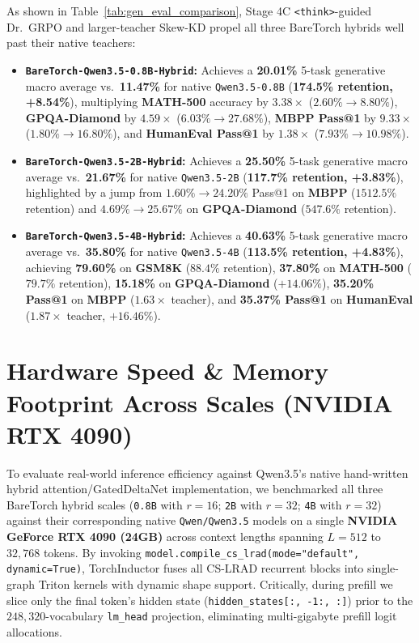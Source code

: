 \documentclass[twocolumn,10pt]{article}
\begin{document}
As shown in Table~\ref{tab:gen_eval_comparison}, Stage 4C \texttt{<think>}-guided Dr.\ GRPO and larger-teacher Skew-KD propel all three BareTorch hybrids well past their native teachers:
\begin{itemize}
    \item \textbf{\texttt{BareTorch-Qwen3.5-0.8B-Hybrid}:} Achieves a \textbf{20.01\%} 5-task generative macro average vs.\ \textbf{11.47\%} for native \texttt{Qwen3.5-0.8B} (\textbf{174.5\% retention, +8.54\%}), multiplying \textbf{MATH-500} accuracy by $3.38\times$ ($2.60\% \to \mathbf{8.80\%}$), \textbf{GPQA-Diamond} by $4.59\times$ ($6.03\% \to \mathbf{27.68\%}$), \textbf{MBPP Pass@1} by $9.33\times$ ($1.80\% \to \mathbf{16.80\%}$), and \textbf{HumanEval Pass@1} by $1.38\times$ ($7.93\% \to \mathbf{10.98\%}$).
    \item \textbf{\texttt{BareTorch-Qwen3.5-2B-Hybrid}:} Achieves a \textbf{25.50\%} 5-task generative macro average vs.\ \textbf{21.67\%} for native \texttt{Qwen3.5-2B} (\textbf{117.7\% retention, +3.83\%}), highlighted by a jump from $1.60\% \to \mathbf{24.20\%}$ Pass@1 on \textbf{MBPP} ($1512.5\%$ retention) and $4.69\% \to \mathbf{25.67\%}$ on \textbf{GPQA-Diamond} ($547.6\%$ retention).
    \item \textbf{\texttt{BareTorch-Qwen3.5-4B-Hybrid}:} Achieves a \textbf{40.63\%} 5-task generative macro average vs.\ \textbf{35.80\%} for native \texttt{Qwen3.5-4B} (\textbf{113.5\% retention, +4.83\%}), achieving \textbf{79.60\%} on \textbf{GSM8K} ($88.4\%$ retention), \textbf{37.80\%} on \textbf{MATH-500} ($79.7\%$ retention), \textbf{15.18\%} on \textbf{GPQA-Diamond} ($+14.06\%$), \textbf{35.20\% Pass@1} on \textbf{MBPP} ($1.63\times$ teacher), and \textbf{35.37\% Pass@1} on \textbf{HumanEval} ($1.87\times$ teacher, $+16.46\%$).
\end{itemize}

\section{Hardware Speed \& Memory Footprint Across Scales (NVIDIA RTX 4090)}
To evaluate real-world inference efficiency against Qwen3.5's native hand-written hybrid attention/GatedDeltaNet implementation, we benchmarked all three BareTorch hybrid scales (\texttt{0.8B} with $r=16$; \texttt{2B} with $r=32$; \texttt{4B} with $r=32$) against their corresponding native \texttt{Qwen/Qwen3.5} models on a single \textbf{NVIDIA GeForce RTX 4090 (24GB)} across context lengths spanning $L=512$ to $32,768$ tokens. By invoking \texttt{model.compile\_cs\_lrad(mode="default", dynamic=True)}, TorchInductor fuses all CS-LRAD recurrent blocks into single-graph Triton kernels with dynamic shape support. Critically, during prefill we slice only the final token's hidden state (\texttt{hidden\_states[:, -1:, :]}) prior to the $248,320$-vocabulary \texttt{lm\_head} projection, eliminating multi-gigabyte prefill logit allocations.
\end{document}

